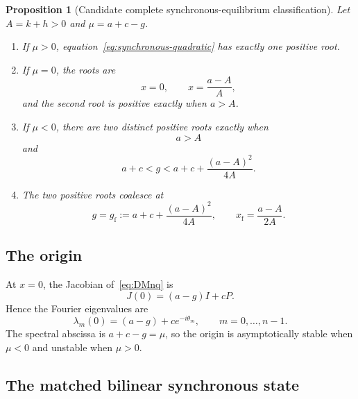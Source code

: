 \documentclass[11pt, reqno]{amsart}
\newtheorem{proposition}[theorem]{Proposition}
\theoremstyle{definition}
\theoremstyle{remark}
\begin{document}
	\begin{proposition}[Candidate complete synchronous-equilibrium classification]
		\label{prop:sync-classification}
		Let $A=k+h>0$ and $\mu=a+c-g$.
		\begin{enumerate}[label=(\roman*),leftmargin=2.5em]
			\item If $\mu>0$, equation~\eqref{eq:synchronous-quadratic} has exactly one
			positive root.
			
			\item If $\mu=0$, the roots are
			\[
			x=0,
			\qquad
			x=\frac{a-A}{A},
			\]
			and the second root is positive exactly when $a>A$.
			
			\item If $\mu<0$, there are two distinct positive roots exactly when
			\[
			a>A
			\]
			and
			\[
			a+c<g<
			a+c+\frac{(a-A)^2}{4A}.
			\]
			
			\item The two positive roots coalesce at
			\begin{equation}
				\label{eq:fold-location}
				g=g_{\mathrm f}
				:=a+c+\frac{(a-A)^2}{4A},
				\qquad
				x_{\mathrm f}=\frac{a-A}{2A}.
			\end{equation}
		\end{enumerate}
	\end{proposition}
	
	
	\subsection{The origin}
	
	At $x=0$, the Jacobian of~\eqref{eq:DMnq} is
	\begin{equation}
		\label{eq:origin-jacobian}
		J(0)=(a-g)I+cP.
	\end{equation}
	Hence the Fourier eigenvalues are
	\begin{equation}
		\label{eq:origin-spectrum}
		\lambda_m(0)
		=(a-g)+c e^{-i\theta_m},
		\qquad m=0,\ldots,n-1.
	\end{equation}
	The spectral abscissa is $a+c-g=\mu$, so the origin is asymptotically stable
	when $\mu<0$ and unstable when $\mu>0$.
	
	
	\subsection{The matched bilinear synchronous state}
	
\end{document}
